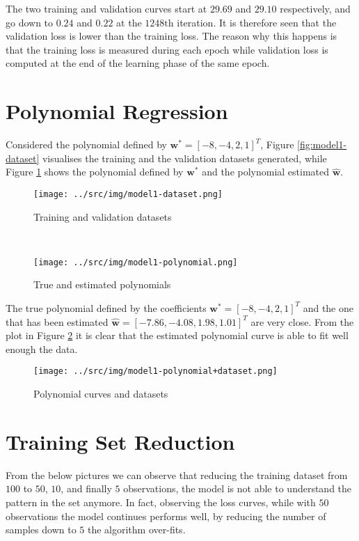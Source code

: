 \documentclass[a4paper,12pt]{article} %
\begin{document}
	The two training and validation curves start at $29.69$ and $29.10$ respectively, and go down to $0.24$ and $0.22$ at the $1248\mathrm{th}$ iteration.
	It is therefore seen that the validation loss is lower than the training 
	loss. {\color{red}The reason why this happens is that the training loss is 
	measured during each epoch while validation loss is computed at the end of 
	the learning phase of the same epoch.}
	
	\section{Polynomial Regression} 
	Considered the polynomial defined by $\textbf{w}^*=[-8,-4,2,1]^T$, Figure 
	\ref{fig:model1-dataset} visualises the training and the validation 
	datasets generated, while Figure \ref{fig:model1-polynomial} shows 
	the polynomial defined by $\textbf{w}^*$ and the polynomial estimated 
	$\hat{\textbf{w}}$.
	
	\begin{figure}[H]
		\begin{minipage}[c]{.49\textwidth}
			\centering
			\texttt{[image: ../src/img/model1-dataset.png]}
			\caption{Training and validation datasets}
			\label{fig:model1-dataset}
		\end{minipage}
		~
		\begin{minipage}[c]{.49\textwidth}
			\centering
			\texttt{[image: ../src/img/model1-polynomial.png]}
			\caption{True and estimated polynomials}
			\label{fig:model1-polynomial}
		\end{minipage}
	\end{figure}
	
 	The true polynomial defined by the coefficients 
 	$\textbf{w}^*=[-8,-4,2,1]^T$ and the one that has been estimated 
 	$\hat{\textbf{w}}=[-7.86,-4.08,1.98,1.01]^T$ are very close.
 	From the plot in Figure \ref{fig:model1-polynomial+dataset} it is clear 
 	that the estimated polynomial curve is able to fit well enough the data.
 	
	\begin{figure}[H]
		\centering
		\texttt{[image: ../src/img/model1-polynomial+dataset.png]}
		\caption{Polynomial curves and datasets}
		\label{fig:model1-polynomial+dataset}
	\end{figure}
	
	\section{Training Set Reduction}
	From the below pictures we can observe that reducing the training dataset 
	from $100$ to $50$, $10$, and finally $5$ observations, the model is not 
	able to understand the pattern in the set anymore. In fact, observing the 
	loss curves, while with $50$ observations the model continues performs 
	well, by reducing the number of samples down to $5$ the algorithm over-fits.
	
\end{document}
